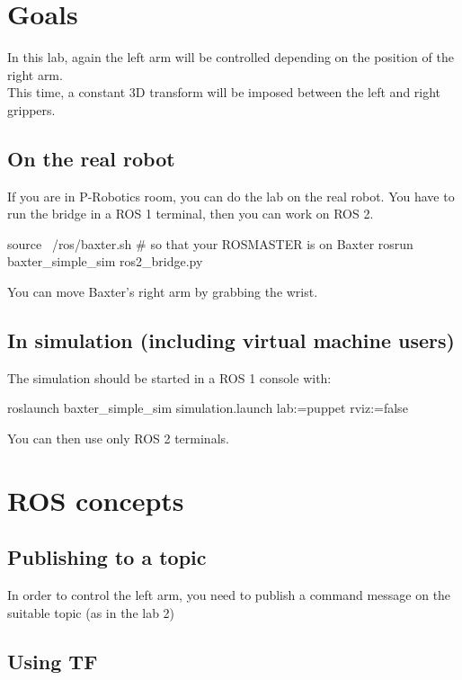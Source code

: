 \documentclass{ecnreport}
\author{O. Kermorgant}
\begin{document}


\section{Goals}

In this lab, again the left arm will be controlled depending on the position of the right arm.\\
This time, a constant 3D transform will be imposed between the left and right grippers. 

\subsection{On the real robot}

If you are in P-Robotics room, you can do the lab on the real robot. You have to run the bridge in a ROS 1 terminal, then you can work on ROS 2.

\begin{bashcodelarge}
 source ~/ros/baxter.sh # so that your ROSMASTER is on Baxter
 rosrun baxter_simple_sim ros2_bridge.py
\end{bashcodelarge}

You can move Baxter's right arm by grabbing the wrist.

\subsection{In simulation (including virtual machine users)}
The simulation should be started in a ROS 1 console with:
\begin{bashcodelarge}
 roslaunch baxter_simple_sim simulation.launch lab:=puppet rviz:=false
\end{bashcodelarge}
You can then use only ROS 2 terminals.

\section{ROS concepts}

\subsection{Publishing to a topic}

In order to control the left arm, you need to publish a command message on the suitable topic (as in the lab 2)

\subsection{Using TF}
\end{document}
